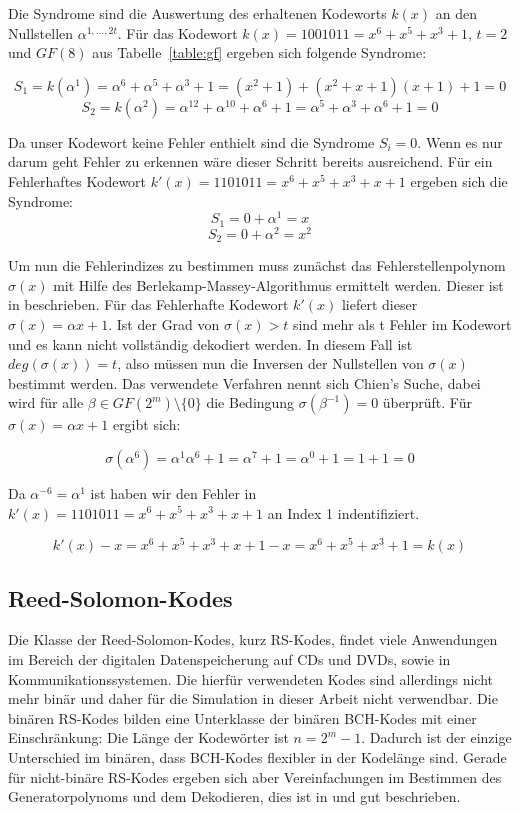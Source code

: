 Die Syndrome sind die Auswertung des erhaltenen Kodeworts $k(x)$ an den Nullstellen $\alpha^{1,...,2t}$. 
Für das Kodewort $k(x) = 1001011 = x^6 + x^5 + x^3 + 1$, $t=2$ und $GF(8)$ aus Tabelle~\ref{table:gf} ergeben sich folgende Syndrome:

$$S_1 = k(\alpha^1) = \alpha^6 + \alpha^5 + \alpha^3 + 1 = (x^2 +1) + (x^2+x+1)(x+1)+1 = 0$$
$$S_2 = k(\alpha^2) = \alpha^{12} + \alpha^{10} + \alpha^6 + 1 = \alpha^5 + \alpha^3 + \alpha^6 + 1 = 0 $$

Da unser Kodewort keine Fehler enthielt sind die Syndrome $S_i = 0$. Wenn es nur darum geht Fehler zu erkennen wäre dieser Schritt bereits ausreichend. Für ein Fehlerhaftes Kodewort $k'(x) = 1101011 = x^6 + x^5 + x^3 + x+1$ ergeben sich die Syndrome: 
$$S_1 = 0 + \alpha^1 = x$$
$$S_2 = 0 + \alpha^2 = x^2$$

Um nun die Fehlerindizes zu bestimmen muss zunächst das Fehlerstellenpolynom $\sigma(x)$ mit Hilfe des Berlekamp-Massey-Algorithmus ermittelt werden. Dieser ist in \cite[Kap 3.5.2]{morelos2006art} beschrieben. Für das Fehlerhafte Kodewort $k'(x)$ liefert dieser $\sigma(x) = \alpha x +1$. Ist der Grad von $\sigma(x) > t$ sind mehr als t Fehler im Kodewort und es kann nicht vollständig dekodiert werden. In diesem Fall ist $deg(\sigma(x)) = t$, also müssen nun die Inversen der Nullstellen von $\sigma(x)$ bestimmt werden. Das verwendete Verfahren nennt sich Chien's Suche, dabei wird für alle $\beta \in GF(2^m)\setminus\{0\}$ die Bedingung $\sigma(\beta^{-1}) = 0$ überprüft.\cite[Kap. 3.5.5]{morelos2006art} Für $\sigma(x) = \alpha x +1$ ergibt sich:

$$\sigma(\alpha^6) = \alpha^1\alpha^6 +1 = \alpha^7 +1 = \alpha^0 + 1 = 1 + 1 = 0$$

Da $\alpha^{-6} = \alpha^1$ ist haben wir den Fehler in $k'(x) = 1101011 = x^6 + x^5 + x^3 + x+1$ an Index 1 indentifiziert.

$$k'(x) - x = x^6 + x^5 + x^3 + x+1 -x = x^6+x^5+x^3+1=k(x)$$



\subsection{Reed-Solomon-Kodes}

Die Klasse der Reed-Solomon-Kodes, kurz RS-Kodes, findet viele Anwendungen im Bereich der digitalen Datenspeicherung auf CDs und DVDs, sowie in Kommunikationssystemen.\cite[Kap. 4]{morelos2006art} Die hierfür verwendeten Kodes sind allerdings nicht mehr binär und daher für die Simulation in dieser Arbeit nicht verwendbar. Die binären RS-Kodes bilden eine Unterklasse der binären BCH-Kodes mit einer Einschränkung: Die Länge der Kodewörter ist $n = 2^m-1$.\cite[Kap 5.2]{huffman2010fundamentals} Dadurch ist der einzige Unterschied im binären, dass BCH-Kodes flexibler in der Kodelänge sind. Gerade für nicht-binäre RS-Kodes ergeben sich aber Vereinfachungen im Bestimmen des Generatorpolynoms und dem Dekodieren, dies ist in \cite[Kap. 4]{morelos2006art} und \cite[Kap. 5.2]{huffman2010fundamentals} gut beschrieben.
